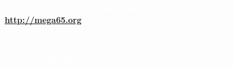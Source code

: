 
\begin{center}
\colorbox{white}{\EANisbn[SC4,ISBN=123-45-67890-12-8]}

\vspace*{\baselineskip}

\textbf{\textcolor{white}{het MEGA Museum of Electronic Games \& Art e.V. \url{http://mega65.org}}}

\textbf{\textcolor{white}{Redactie: Univ. hoofddoc. Dr. Paul Gardner-Stephen.}}

\textbf{\textcolor{white}{Vertaling: Daniël Mantione.}}
\end{center}




